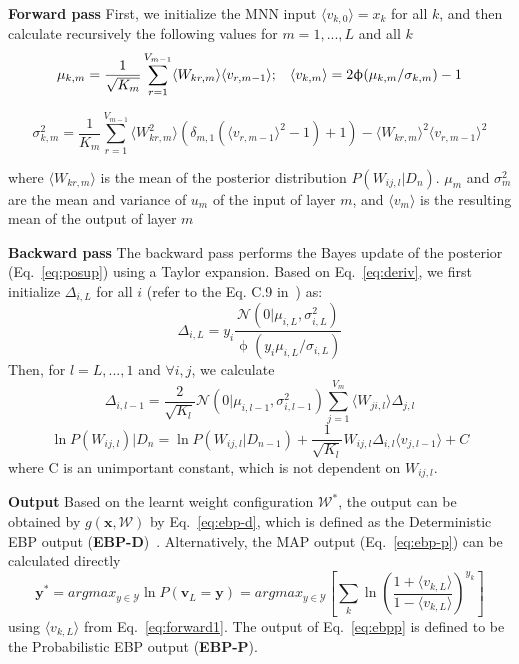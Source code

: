 \documentclass{article} %
\begin{document}
\textbf{Forward pass} First, we initialize the MNN input $\langle v_{k,0} \rangle=x_k$ for all $k$, and then calculate recursively the following values for $m = 1, ..., L$ and all $k$
\begin{equation} \label{eq:forward1}
    \mu_{k,m} = \frac{1}{\sqrt{K_m}}\sum^{V_{m-1}}_{r=1}\langle W_{kr,m} \rangle\langle v_{r,m-1}\rangle; \hspace{0.3cm} \langle v_{k,m} \rangle = 2 \upphi (\mu_{k,m}/\sigma_{k,m})-1
\end{equation}

\begin{equation}\label{eq:forward2}
    \sigma^2_{k,m}=\frac{1}{K_m}\sum^{V_{m-1}}_{r=1}\langle W^2_{kr,m} \rangle(\delta_{m,1}(\langle v_{r,m-1} \rangle^2 - 1)+1)-\langle W_{kr,m} \rangle^2\langle v_{r,m-1} \rangle^2
\end{equation}

where $\langle W_{kr,m} \rangle$ is the mean of the posterior distribution $P(W_{ij,l}|D_n)$. $\mu_m$ and $\sigma^2_m$ are the mean and variance of $u_m$ of the input of layer $m$, and $\langle v_m \rangle$ is the resulting mean of the output of layer $m$

\textbf{Backward pass} The backward pass performs the Bayes update of the posterior (Eq.~\ref{eq:posup}) using a Taylor expansion. Based on Eq.~\ref{eq:deriv}, we first initialize $\Delta_{i,L}$ for all $i$ (refer to the Eq. C.9 in~\citep{Soudry14}) as:
\begin{equation}
    \Delta_{i,L} = y_i\frac{\mathcal{N}(0|\mu_{i,L},\sigma^2_{i,L})}{\upphi(y_i\mu_{i,L}/\sigma_{i,L})}
\end{equation}
Then, for $l=L, ..., 1$ and $\forall{i,j}$, we calculate
\begin{equation}
    \Delta_{i,l-1} = \frac{2}{\sqrt{K_l}}\mathcal{N}(0|\mu_{i,l-1},\sigma^2_{i,l-1})\sum^{V_m}_{j=1}\langle W_{ji,l} \rangle\Delta_{j,l}
\end{equation}
\begin{equation} \label{eq:backward2}
    \ln{P(W_{ij,l})|D_n}=\ln{P(W_{ij,l}|D_{n-1})}+\frac{1}{\sqrt{K_l}}W_{ij,l}\Delta_{i,l}\langle v_{j,l-1} \rangle + C
\end{equation}
where C is an unimportant constant, which is not dependent on $W_{ij,l}$.

\textbf{Output} Based on the learnt weight configuration $\mathcal{W}^*$, the output can be obtained by $g(\bm{x}, \mathcal{W})$ by Eq.~\ref{eq:ebp-d}, which is defined as the Deterministic EBP output (\textbf{EBP-D})~\citep{Soudry14}. Alternatively, the MAP output (Eq.~\ref{eq:ebp-p}) can be calculated directly
\begin{equation} \label{eq:ebpp}
    \textbf{y}^* = argmax_{y \in \mathcal{Y}}\ln P(\textbf{v}_L=\textbf{y})=argmax_{y \in \mathcal{Y}}[\sum_k\ln(\frac{1+\langle v_{k,L} \rangle}{1 - \langle v_{k,L} \rangle})^{y_k}]
\end{equation}
using $\langle v_{k, L} \rangle$ from Eq.~\ref{eq:forward1}. The output of Eq.~\ref{eq:ebpp} is defined to be the Probabilistic EBP output (\textbf{EBP-P}).
\end{document}
